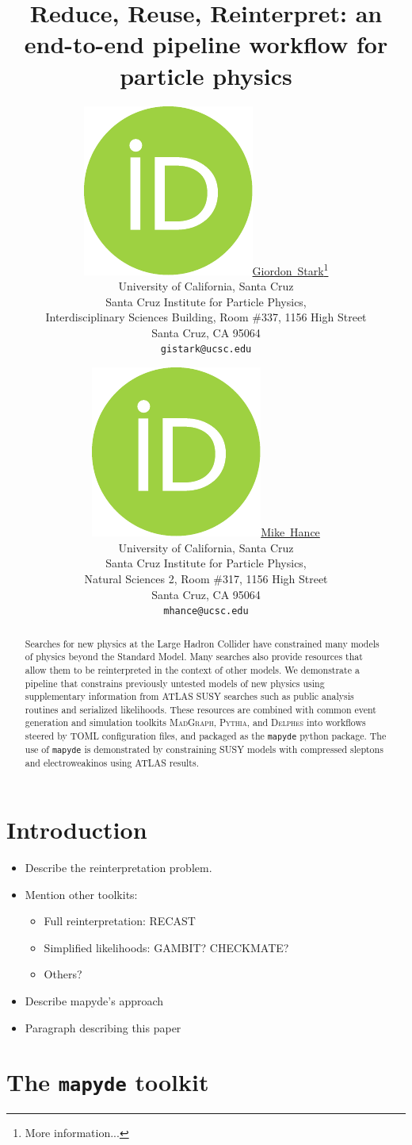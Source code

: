 \documentclass{article}
\title{Reduce, Reuse, Reinterpret: an end-to-end pipeline workflow for particle physics}
\author{ \href{https://orcid.org/0000-0001-6616-3433}{\includegraphics[scale=0.06]{orcid.pdf}\hspace{1mm}Giordon~Stark}\thanks{More information...} \\
  University of California, Santa Cruz \\
  Santa Cruz Institute for Particle Physics, \\
  Interdisciplinary Sciences Building, Room \#337, 1156 High Street \\
  Santa Cruz, CA 95064 \\
	\texttt{gistark@ucsc.edu} \\
	\and
	\href{https://orcid.org/0000-0001-8392-0934}{\includegraphics[scale=0.06]{orcid.pdf}\hspace{1mm}Mike~Hance} \\
  University of California, Santa Cruz \\
  Santa Cruz Institute for Particle Physics, \\
  Natural Sciences 2, Room \#317, 1156 High Street \\
  Santa Cruz, CA 95064 \\
	\texttt{mhance@ucsc.edu} \\
}
\begin{document}
\maketitle

\begin{abstract}
Searches for new physics at the Large Hadron Collider have constrained many models of physics beyond the Standard Model.  Many searches also provide resources that allow them to be reinterpreted in the context of other models.  We demonstrate a pipeline that constrains previously untested models of new physics using supplementary information from ATLAS SUSY searches such as public analysis routines and serialized likelihoods.  These resources are combined with common event generation and simulation toolkits \textsc{MadGraph}, \textsc{Pythia}, and \textsc{Delphes} into workflows steered by \textsc{TOML} configuration files, and packaged as the \texttt{mapyde} python package.  The use of \texttt{mapyde} is demonstrated by constraining SUSY models with compressed sleptons and electroweakinos using ATLAS results.
\end{abstract}




\section{Introduction}
\label{sec:introduction}

\begin{itemize}
\item Describe the reinterpretation problem.
\item Mention other toolkits:
  \begin{itemize}
  \item Full reinterpretation: RECAST
  \item Simplified likelihoods: GAMBIT? CHECKMATE?
  \item Others?
  \end{itemize}
\item Describe mapyde's approach
\item Paragraph describing this paper
\end{itemize}

\section{The \texttt{mapyde} toolkit}
\label{sec:mapyde}
\end{document}
